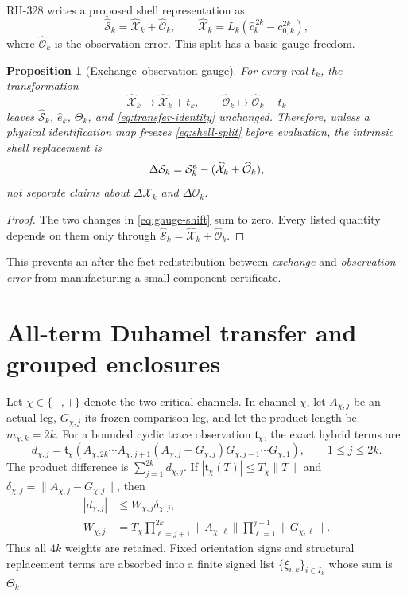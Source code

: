 \documentclass[11pt]{article}
\newtheorem{proposition}[theorem]{Proposition}
\theoremstyle{remark}
\newcommand{\cO}{\mathcal O}
\newcommand{\cS}{\mathcal S}
\newcommand{\cX}{\mathcal X}
\newcommand{\wh}[1]{\widehat{#1}}
\begin{document}
RH-328 writes a proposed shell representation as
\begin{equation}
 \wh\cS_k=\wh\cX_k+\wh\cO_k,
 \qquad
 \wh\cX_k
 =L_k(\wh c_k^{\,2k}-c_{0,k}^{2k}),
 \label{eq:shell-split}
\end{equation}
where $\wh\cO_k$ is the observation error.  This split has a basic gauge
freedom.

\begin{proposition}[Exchange--observation gauge]
\label{prop:gauge}
For every real $t_k$, the transformation
\begin{equation}
 \wh\cX_k\longmapsto\wh\cX_k+t_k,
 \qquad
 \wh\cO_k\longmapsto\wh\cO_k-t_k
 \label{eq:gauge-shift}
\end{equation}
leaves $\wh\cS_k$, $\wh e_k$, $\Theta_k$, and
\eqref{eq:transfer-identity} unchanged.  Therefore, unless a physical
identification map freezes \eqref{eq:shell-split} before evaluation, the
intrinsic shell replacement is
\begin{equation}
 \Delta\cS_k
 =\cS_k^{\rm a}-(\wh\cX_k+\wh\cO_k),
 \label{eq:observable-shell-defect}
\end{equation}
not separate claims about $\Delta\cX_k$ and $\Delta\cO_k$.
\end{proposition}

\begin{proof}
The two changes in \eqref{eq:gauge-shift} sum to zero.  Every listed
quantity depends on them only through $\wh\cS_k=\wh\cX_k+\wh\cO_k$.
\end{proof}

This prevents an after-the-fact redistribution between \emph{exchange} and
\emph{observation error} from manufacturing a small component certificate.

\section{All-term Duhamel transfer and grouped enclosures}

Let $\chi\in\{-,+\}$ denote the two critical channels.  In channel $\chi$,
let $A_{\chi,j}$ be an actual leg, $G_{\chi,j}$ its frozen comparison leg,
and let the product length be $m_{\chi,k}=2k$.  For a bounded cyclic trace
observation $\mathfrak t_\chi$, the exact hybrid terms are
\begin{equation}
 d_{\chi,j}
 =\mathfrak t_\chi\!\left(
 A_{\chi,2k}\cdots A_{\chi,j+1}
 (A_{\chi,j}-G_{\chi,j})
 G_{\chi,j-1}\cdots G_{\chi,1}\right),
 \qquad 1\le j\le2k.
 \label{eq:hybrid-terms}
\end{equation}
The product difference is $\sum_{j=1}^{2k}d_{\chi,j}$.  If
$|\mathfrak t_\chi(T)|\le T_\chi\lVert T\rVert$ and
$\delta_{\chi,j}=\lVert A_{\chi,j}-G_{\chi,j}\rVert$, then
\begin{align}
 |d_{\chi,j}|&\le W_{\chi,j}\delta_{\chi,j},
 \label{eq:term-bound}\\
 W_{\chi,j}
 &=T_\chi
 \prod_{\ell=j+1}^{2k}\lVert A_{\chi,\ell}\rVert
 \prod_{\ell=1}^{j-1}\lVert G_{\chi,\ell}\rVert.
 \label{eq:duhamel-weight}
\end{align}
Thus all $4k$ weights are retained.  Fixed orientation signs and structural
replacement terms are absorbed into a finite signed list
$\{\xi_{i,k}\}_{i\in I_k}$ whose sum is $\Theta_k$.
\end{document}
